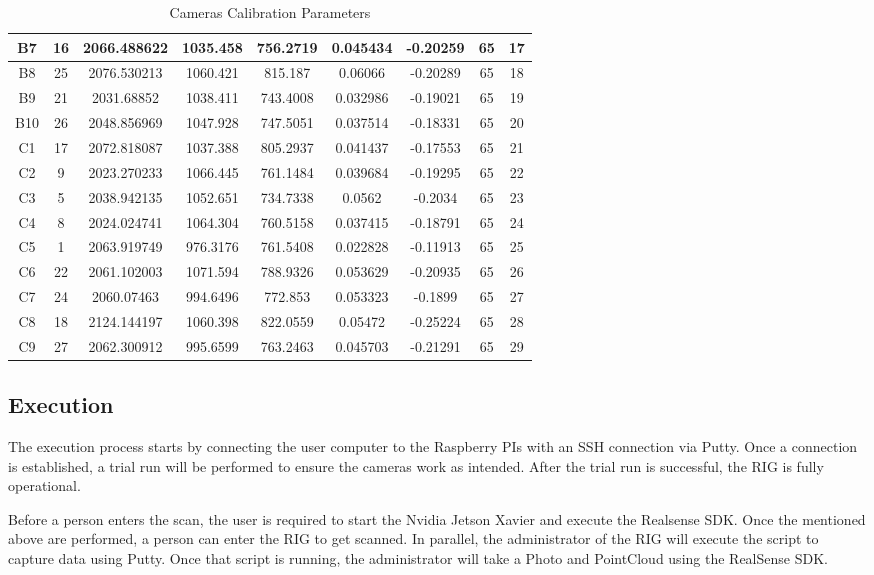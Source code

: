 \documentclass[12pt]{report}
\begin{document}
\begin{table}[H]
{\begin{tabular}{|c|c|c|c|c|c|c|c|c|}
  B7    & 16    & 2066.488622 & 1035.458 & 756.2719 & 0.045434 & -0.20259 & 65 & 17 \\ \hline
  B8    & 25    & 2076.530213 & 1060.421 & 815.187  & 0.06066  & -0.20289 & 65 & 18 \\ \hline
  B9    & 21    & 2031.68852  & 1038.411 & 743.4008 & 0.032986 & -0.19021 & 65 & 19 \\ \hline
  B10   & 26    & 2048.856969 & 1047.928 & 747.5051 & 0.037514 & -0.18331 & 65 & 20 \\ \hline
  C1    & 17    & 2072.818087 & 1037.388 & 805.2937 & 0.041437 & -0.17553 & 65 & 21 \\ \hline
  C2    & 9     & 2023.270233 & 1066.445 & 761.1484 & 0.039684 & -0.19295 & 65 & 22 \\ \hline
  C3    & 5     & 2038.942135 & 1052.651 & 734.7338 & 0.0562   & -0.2034  & 65 & 23 \\ \hline
  C4    & 8     & 2024.024741 & 1064.304 & 760.5158 & 0.037415 & -0.18791 & 65 & 24 \\ \hline
  C5    & 1     & 2063.919749 & 976.3176 & 761.5408 & 0.022828 & -0.11913 & 65 & 25 \\ \hline
  C6    & 22    & 2061.102003 & 1071.594 & 788.9326 & 0.053629 & -0.20935 & 65 & 26 \\ \hline
  C7    & 24    & 2060.07463  & 994.6496 & 772.853  & 0.053323 & -0.1899  & 65 & 27 \\ \hline
  C8    & 18    & 2124.144197 & 1060.398 & 822.0559 & 0.05472  & -0.25224 & 65 & 28 \\ \hline
  C9    & 27    & 2062.300912 & 995.6599 & 763.2463 & 0.045703 & -0.21291 & 65 & 29 \\ \hline
  \end{tabular}%
  }
  \caption{Cameras Calibration Parameters}
  \label{tab:Camera_Calibration}
  \end{table}


\newpage
  \subsection*{Execution}
  The execution process starts by connecting the user computer to the Raspberry PIs with an SSH connection via Putty.
  Once a connection is established, a trial run will be performed to ensure the cameras work as intended.
  After the trial run is successful, the RIG is fully operational.
  
  Before a person enters the scan, the user is required to start the Nvidia Jetson Xavier and execute the Realsense SDK.
  Once the mentioned above are performed, a person can enter the RIG to get scanned.
  In parallel, the administrator of the RIG will execute the script to capture data using Putty. Once that script is running, the administrator will take a Photo and PointCloud
  using the RealSense SDK. 
  
\end{document}
